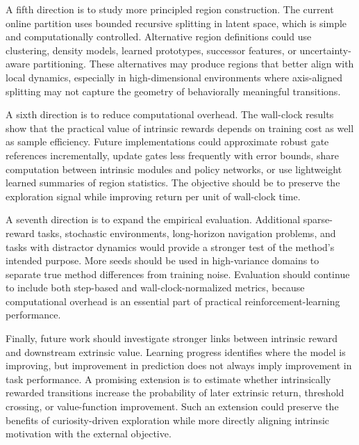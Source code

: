 A fifth direction is to study more principled region construction.
The current online partition uses bounded recursive splitting in latent space, which is simple and computationally controlled.
Alternative region definitions could use clustering, density models, learned prototypes, successor features, or uncertainty-aware partitioning.
These alternatives may produce regions that better align with local dynamics, especially in high-dimensional environments where axis-aligned splitting may not capture the geometry of behaviorally meaningful transitions.

A sixth direction is to reduce computational overhead.
The wall-clock results show that the practical value of intrinsic rewards depends on training cost as well as sample efficiency.
Future implementations could approximate robust gate references incrementally, update gates less frequently with error bounds, share computation between intrinsic modules and policy networks, or use lightweight learned summaries of region statistics.
The objective should be to preserve the exploration signal while improving return per unit of wall-clock time.

A seventh direction is to expand the empirical evaluation.
Additional sparse-reward tasks, stochastic environments, long-horizon navigation problems, and tasks with distractor dynamics would provide a stronger test of the method's intended purpose.
More seeds should be used in high-variance domains to separate true method differences from training noise.
Evaluation should continue to include both step-based and wall-clock-normalized metrics, because computational overhead is an essential part of practical reinforcement-learning performance.

Finally, future work should investigate stronger links between intrinsic reward and downstream extrinsic value.
Learning progress identifies where the model is improving, but improvement in prediction does not always imply improvement in task performance.
A promising extension is to estimate whether intrinsically rewarded transitions increase the probability of later extrinsic return, threshold crossing, or value-function improvement.
Such an extension could preserve the benefits of curiosity-driven exploration while more directly aligning intrinsic motivation with the external objective.